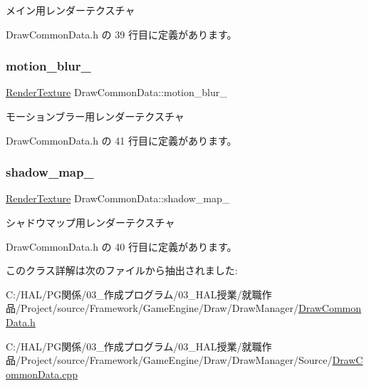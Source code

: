 メイン用レンダーテクスチャ 



 Draw\+Common\+Data.\+h の 39 行目に定義があります。

\mbox{\label{class_draw_common_data_a5f035e541464571beb8d2e2350981aab}} 
\subsubsection{\texorpdfstring{motion\+\_\+blur\+\_\+}{motion\_blur\_}}
{\footnotesize\ttfamily \mbox{\hyperlink{class_render_texture}{Render\+Texture}} Draw\+Common\+Data\+::motion\+\_\+blur\+\_\+\hspace{0.3cm}{\ttfamily [private]}}



モーションブラー用レンダーテクスチャ 



 Draw\+Common\+Data.\+h の 41 行目に定義があります。

\mbox{\label{class_draw_common_data_a6cd0f6dae97b2058c9fff40b6a7cfc17}} 
\subsubsection{\texorpdfstring{shadow\+\_\+map\+\_\+}{shadow\_map\_}}
{\footnotesize\ttfamily \mbox{\hyperlink{class_render_texture}{Render\+Texture}} Draw\+Common\+Data\+::shadow\+\_\+map\+\_\+\hspace{0.3cm}{\ttfamily [private]}}



シャドウマップ用レンダーテクスチャ 



 Draw\+Common\+Data.\+h の 40 行目に定義があります。



このクラス詳解は次のファイルから抽出されました\+:\begin{DoxyCompactItemize}
\item 
C\+:/\+H\+A\+L/\+P\+G関係/03\+\_\+作成プログラム/03\+\_\+\+H\+A\+L授業/就職作品/\+Project/source/\+Framework/\+Game\+Engine/\+Draw/\+Draw\+Manager/\mbox{\hyperlink{_draw_common_data_8h}{Draw\+Common\+Data.\+h}}\item 
C\+:/\+H\+A\+L/\+P\+G関係/03\+\_\+作成プログラム/03\+\_\+\+H\+A\+L授業/就職作品/\+Project/source/\+Framework/\+Game\+Engine/\+Draw/\+Draw\+Manager/\+Source/\mbox{\hyperlink{_draw_common_data_8cpp}{Draw\+Common\+Data.\+cpp}}\end{DoxyCompactItemize}
